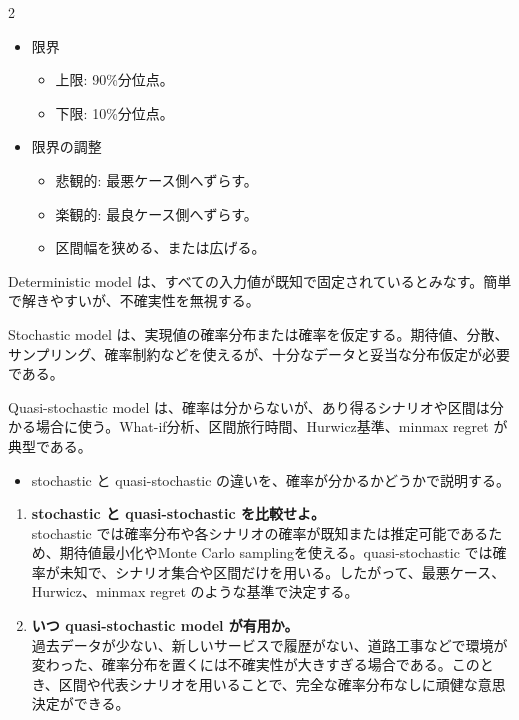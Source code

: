 \clearpage
{}
\begin{multicols}{2}\footnotesize\raggedcolumns
{}
\begin{itemize}
\item 限界
\begin{itemize}
\item 上限: 90\%分位点。
\item 下限: 10\%分位点。
\end{itemize}
\item 限界の調整
\begin{itemize}
\item 悲観的: 最悪ケース側へずらす。
\item 楽観的: 最良ケース側へずらす。
\item 区間幅を狭める、または広げる。
\end{itemize}
\end{itemize}
Deterministic model は、すべての入力値が既知で固定されているとみなす。簡単で解きやすいが、不確実性を無視する。\par

Stochastic model は、実現値の確率分布または確率を仮定する。期待値、分散、サンプリング、確率制約などを使えるが、十分なデータと妥当な分布仮定が必要である。\par

Quasi-stochastic model は、確率は分からないが、あり得るシナリオや区間は分かる場合に使う。What-if分析、区間旅行時間、Hurwicz基準、minmax regret が典型である。\par
{}
\begin{itemize}
\item stochastic と quasi-stochastic の違いを、確率が分かるかどうかで説明する。
\end{itemize}
\begin{enumerate}
\item \textbf{stochastic と quasi-stochastic を比較せよ。}\\stochastic では確率分布や各シナリオの確率が既知または推定可能であるため、期待値最小化やMonte Carlo samplingを使える。quasi-stochastic では確率が未知で、シナリオ集合や区間だけを用いる。したがって、最悪ケース、Hurwicz、minmax regret のような基準で決定する。
\item \textbf{いつ quasi-stochastic model が有用か。}\\過去データが少ない、新しいサービスで履歴がない、道路工事などで環境が変わった、確率分布を置くには不確実性が大きすぎる場合である。このとき、区間や代表シナリオを用いることで、完全な確率分布なしに頑健な意思決定ができる。
\end{enumerate}
\end{multicols}

